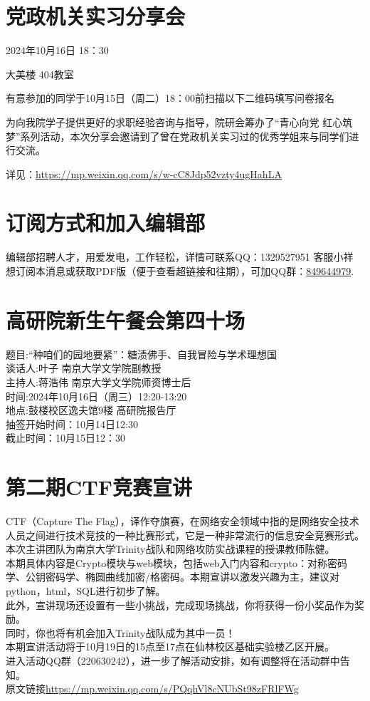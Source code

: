 \documentclass[letterpaper, 12pt]{article}
\begin{document}
\begin{multicols}{2}
\section{党政机关实习分享会}
2024年10月16日 18：30

大美楼 404教室

有意参加的同学于10月15日（周二）18：00前扫描以下二维码填写问卷报名

为向我院学子提供更好的求职经验咨询与指导，院研会筹办了“青心向党 红心筑梦”系列活动，本次分享会邀请到了曾在党政机关实习过的优秀学姐来与同学们进行交流。

详见：\url{https://mp.weixin.qq.com/s/w-cC8Jdp52vzty4ugHahLA}
\section{订阅方式和加入编辑部}
编辑部招聘人才，用爱发电，工作轻松，详情可联系QQ：1329527951 客服小祥\\想订阅本消息或获取PDF版（便于查看超链接和往期），可加QQ群：\href{https://qm.qq.com/q/FGX1VYCrGS}{849644979}.
\section{高研院新生午餐会第四十场}
题目:“种咱们的园地要紧”：糖渍佛手、自我冒险与学术理想国\\
谈话人:叶子 南京大学文学院副教授\\
主持人:蒋浩伟 南京大学文学院师资博士后\\
时间:2024年10月16日（周三）12:20-13:20\\
地点:鼓楼校区逸夫馆9楼 高研院报告厅\\
抽签开始时间：10月14日12:30\\
截止时间：10月15日12：30\\

\section{第二期CTF竞赛宣讲}
CTF（Capture The Flag），译作夺旗赛，在网络安全领域中指的是网络安全技术人员之间进行技术竞技的一种比赛形式，它是一种非常流行的信息安全竞赛形式。\\
本次主讲团队为南京大学Trinity战队和网络攻防实战课程的授课教师陈健。\\
本期具体内容是Crypto模块与web模块，包括web入门内容和crypto：对称密码学、公钥密码学、椭圆曲线加密/格密码。本期宣讲以激发兴趣为主，建议对python，html，SQL进行初步了解。\\
此外，宣讲现场还设置有一些小挑战，完成现场挑战，你将获得一份小奖品作为奖励。\\
同时，你也将有机会加入Trinity战队成为其中一员！\\
本期宣讲活动将于10月19日的15点至17点在仙林校区基础实验楼乙区开展。\\
进入活动QQ群（220630242），进一步了解活动安排，如有调整将在活动群中告知。\\
原文链接\url{https://mp.weixin.qq.com/s/PQqhVl8cNUbSt98zFRlFWg}


\end{multicols}
\end{document}
